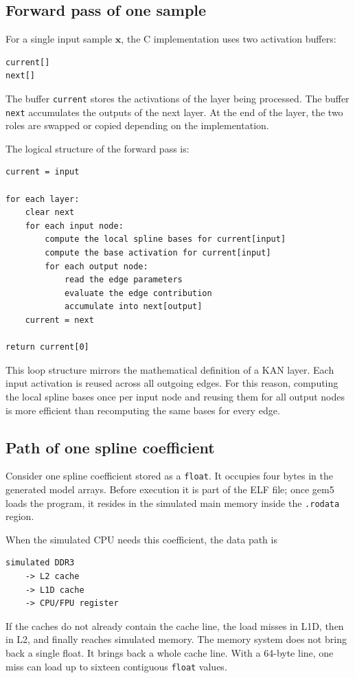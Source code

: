 \documentclass[11pt,a4paper]{article}
\begin{document}
\subsection{Forward pass of one sample}

For a single input sample $\bm{x}$, the C implementation uses two activation buffers:
\begin{verbatim}
current[]
next[]
\end{verbatim}
The buffer \texttt{current} stores the activations of the layer being processed.
The buffer \texttt{next} accumulates the outputs of the next layer.
At the end of the layer, the two roles are swapped or copied depending on the implementation.

The logical structure of the forward pass is:
\begin{verbatim}
current = input

for each layer:
    clear next
    for each input node:
        compute the local spline bases for current[input]
        compute the base activation for current[input]
        for each output node:
            read the edge parameters
            evaluate the edge contribution
            accumulate into next[output]
    current = next

return current[0]
\end{verbatim}
This loop structure mirrors the mathematical definition of a KAN layer.
Each input activation is reused across all outgoing edges.
For this reason, computing the local spline bases once per input node and reusing them for all output nodes is more efficient than recomputing the same bases for every edge.

\subsection{Path of one spline coefficient}

Consider one spline coefficient stored as a \texttt{float}.
It occupies four bytes in the generated model arrays.
Before execution it is part of the ELF file; once gem5 loads the program, it resides in the simulated main memory inside the \texttt{.rodata} region.

When the simulated CPU needs this coefficient, the data path is
\begin{verbatim}
simulated DDR3
    -> L2 cache
    -> L1D cache
    -> CPU/FPU register
\end{verbatim}
If the caches do not already contain the cache line, the load misses in L1D, then in L2, and finally reaches simulated memory.
The memory system does not bring back a single float.
It brings back a whole cache line.
With a 64-byte line, one miss can load up to sixteen contiguous \texttt{float} values.
\end{document}
